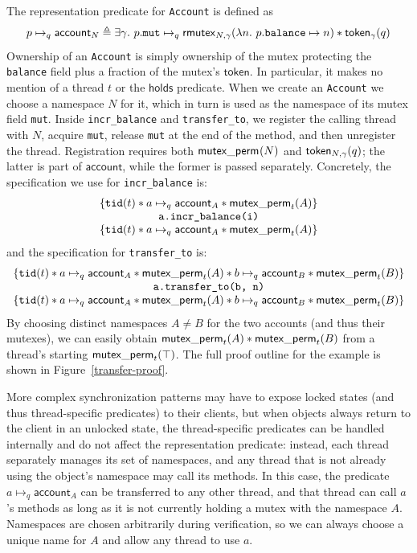 \documentclass[acmsmall,screen,review,anonymous]{acmart}
\begin{document}
The representation predicate for \lstinline{Account} is defined as
\[p \mapsto_q \mathsf{account}_N \triangleq \exists \gamma.\ p.\texttt{mut} \mapsto_q \rmutex{N, \gamma}{\lambda n.\ p.\texttt{balance} \mapsto n} \ast \mathsf{token}_\gamma(q) %
\]
Ownership of an \lstinline{Account} is simply ownership of the mutex protecting the \lstinline{balance} field plus a fraction of the mutex's $\mathsf{token}$. In particular, it makes no mention of a thread $t$ or the $\mathsf{holds}$ predicate. When we create an \lstinline{Account} we choose a namespace $N$ for it, which in turn is used as the namespace of its mutex field \lstinline{mut}. Inside \lstinline{incr_balance} and \lstinline{transfer_to}, we register the calling thread with $N$, %
acquire \lstinline{mut}, release \lstinline{mut} at the end of the method, and then unregister the thread. Registration requires both $\mathsf{mutex\_perm}_{}(N)$ and $\mathsf{token}_{N, \gamma}(q)$; the latter is part of $\mathsf{account}$, while the former is passed separately. Concretely, the specification we use for \lstinline{incr_balance} is:
\[\begin{array}{c}
\{  \mathtt{tid}(t) \ast a \mapsto_q \mathsf{account}_A \ast \mathsf{mutex\_perm}_{t}(A) \} \\ \texttt{a.incr\_balance(i)}\\ 
\{  \mathtt{tid}(t) \ast a \mapsto_q \mathsf{account}_A \ast \mathsf{mutex\_perm}_{t}(A) \} \end{array}\]
and the specification for \lstinline{transfer_to} is:
\[\begin{array}{c}\{ \mathtt{tid}(t) \ast a \mapsto_q \mathsf{account}_A \ast \mathsf{mutex\_perm}_{t}(A) \ast b \mapsto_q \mathsf{account}_B \ast \mathsf{mutex\_perm}_{t}(B) \}\\ \texttt{a.transfer\_to(b, n)}\\ \{  \mathtt{tid}(t) \ast a \mapsto_q \mathsf{account}_A \ast \mathsf{mutex\_perm}_{t}(A) \ast b \mapsto_q \mathsf{account}_B  \ast \mathsf{mutex\_perm}_{t}(B) \}
\end{array}\]
By choosing distinct namespaces $A \neq B$ for the two accounts (and thus their mutexes), we can easily obtain $\mathsf{mutex\_perm}_{t}(A) \ast \mathsf{mutex\_perm}_{t}(B)$ from a thread's starting $\mathsf{mutex\_perm}_{t}(\top)$. The full proof outline for the example is shown in Figure~\ref{transfer-proof}.

More complex synchronization patterns may have to expose locked states (and thus thread-specific predicates) to their clients, but when objects always return to the client in an unlocked state, the thread-specific predicates can be handled internally and do not affect the representation predicate: instead, each thread separately manages its set of namespaces, and any thread that is not already using the object's namespace may call its methods. In this case, the predicate $a \mapsto_q \mathsf{account}_A$ can be transferred to any other thread, and that thread can call $a$'s methods as long as it is not currently holding a mutex with the namespace $A$. Namespaces are chosen arbitrarily during verification, so we can always choose a unique name for $A$ and allow any thread to use $a$. %
\end{document}
